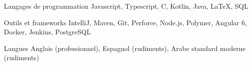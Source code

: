 
\begin{cvskills}

\cvskill
{Langages de programmation}
{Javascript, Typescript, C, Kotlin, Java, LaTeX, SQL}

\cvskill
{Outils et frameworks}
{IntelliJ, Maven, Git, Perforce, Node.js, Polymer, Angular 6, Docker, Jenkins, PostgreSQL}

\cvskill
{Langues}
{Anglais (professionnel), Espagnol (rudiments), Arabe standard moderne (rudiments)}


\end{cvskills}
